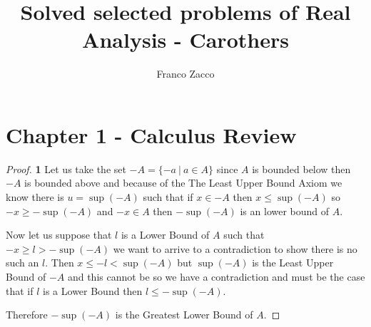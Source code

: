 \documentclass[11pt]{article}
\title{\textbf{Solved selected problems of Real Analysis - Carothers}}
\author{Franco Zacco}
\date{}
\theoremstyle{definition}
\begin{document}
\maketitle
\thispagestyle{empty}

\section*{Chapter 1 - Calculus Review}

	\begin{proof}{\textbf{1}}
        Let us take the set $-A = \{-a ~|~ a \in A\}$ since $A$ is bounded below then
        $-A$ is bounded above and because of the The Least Upper Bound Axiom we know
        there is $u = \sup(-A)$ such that if $x \in -A$ then $x \leq \sup(-A)$
        so $-x \geq -\sup(-A)$ and $-x \in A$ then $-\sup(-A)$ is an lower bound of $A$.

        Now let us suppose that $l$ is a Lower Bound of $A$ such that 
        $-x \geq l > -\sup(-A)$ we want to
        arrive to a contradiction to show there is no such an $l$. Then
        $x \leq -l < \sup(-A)$ but $\sup(-A)$ is the Least Upper Bound of $-A$ and this
        cannot be so we have a contradiction and must be the case that if $l$ is a Lower
        Bound then $l \leq -\sup(-A)$.

        Therefore $-\sup(-A)$ is the Greatest Lower Bound of $A$.  
    \end{proof}
\cleardoublepage
\end{document}
